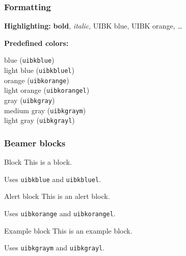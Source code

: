 \documentclass[11pt,t,usepdftitle=false,aspectratio=169]{beamer}
\begin{document}
\begin{frame}[fragile]
\frametitle{Formatting}

   \textbf{Highlighting:} \textbf{bold}, \textit{italic}, {\color{uibkblue} UIBK blue}, {\color{uibkorange} UIBK orange}, \dots

   \bigskip
   
   \textbf{Predefined colors:}
   
   \smallskip
   
    \quad blue (\verb|uibkblue|) \\[1mm]
    \quad light blue (\verb|uibkbluel|) \\[1mm]
    \quad orange (\verb|uibkorange|) \\[1mm]
    \quad light orange (\verb|uibkorangel|) \\[1mm]
    \quad gray (\verb|uibkgray|) \\[1mm]
    \quad medium gray (\verb|uibkgraym|) \\[1mm]
    \quad light gray (\verb|uibkgrayl|)

\end{frame}


\begin{frame}[fragile]
\frametitle{Beamer blocks}

   \begin{block}{Block}
      This is a block.

      Uses \verb|uibkblue| and \verb|uibkbluel|.
   \end{block}

\medskip

   \begin{alertblock}{Alert block}
      This is an alert block.

      Uses \verb|uibkorange| and \verb|uibkorangel|.
   \end{alertblock}

\medskip

   \begin{exampleblock}{Example block}
      This is an example block.

      Uses \verb|uibkgraym| and \verb|uibkgrayl|.
   \end{exampleblock}

\end{frame}
\end{document}
